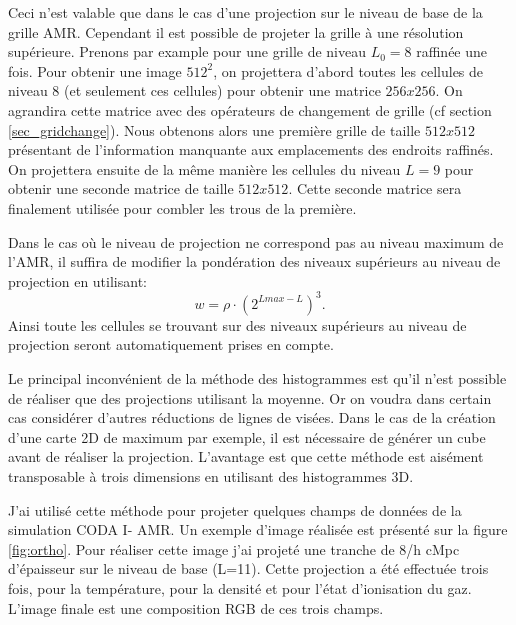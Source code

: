 Ceci n'est valable que dans le cas d'une projection sur le niveau de base de la grille \ac{AMR}.
Cependant il est possible de projeter la grille à une résolution supérieure.
Prenons par example pour une grille de niveau $L_{0}=8$ raffinée une fois.
Pour obtenir une image $512^2$, on projettera d'abord toutes les cellules de niveau 8 (et seulement ces cellules) pour obtenir une matrice $256x256$.
On agrandira cette matrice avec des opérateurs de changement de grille (cf section \ref{sec_gridchange}).
Nous obtenons alors une première grille de taille $512x512$ présentant de l'information manquante aux emplacements des endroits raffinés.
On projettera ensuite de la même manière les cellules du niveau $L=9$ pour obtenir une seconde matrice de taille $512x512$.
Cette seconde matrice sera finalement utilisée pour combler les trous de la première.

Dans le cas où le niveau de projection ne correspond pas au niveau maximum de l'\ac{AMR}, il suffira de modifier la pondération des niveaux supérieurs au niveau de projection en utilisant:
\begin{equation}
w = \rho \cdot \left( 2^{Lmax-L} \right)^3.
\end{equation}
Ainsi toute les cellules se trouvant sur des niveaux supérieurs au niveau de projection seront automatiquement prises en compte.

Le principal inconvénient de la méthode des histogrammes est qu'il n'est possible de réaliser que des projections utilisant la moyenne.
Or on voudra dans certain cas considérer d'autres réductions de lignes de visées.
Dans le cas de la création d'une carte 2D de maximum par exemple, il est nécessaire de générer un cube avant de réaliser la projection.
L'avantage est que cette méthode est aisément transposable à trois dimensions en utilisant des histogrammes 3D.




J'ai utilisé cette méthode pour projeter quelques champs de données de la simulation CODA I- AMR.
Un exemple d'image réalisée est présenté sur la figure \ref{fig:ortho}.
Pour réaliser cette image j'ai projeté une tranche de 8/h cMpc d'épaisseur sur le niveau de base (L=11).
Cette projection a été effectuée trois fois, pour la température, pour la densité et pour l'état d'ionisation du gaz.
L'image finale est une composition RGB de ces trois champs.

